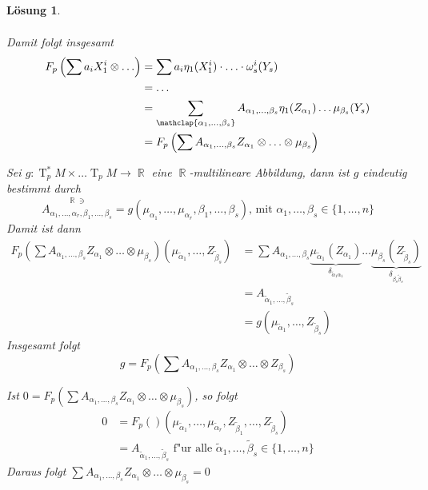 \documentclass[paper=A4, twoside, chapterprefix=true, bibliography=totoc, headsepline]{scrbook}
\DeclareMathOperator{\R}{\mathbb{R}}
\DeclareMathOperator{\T}{T} %
\newcommand{\X}{\times}
\theoremstyle{plain}
\theoremstyle{nonumberplain}
\theoremstyle{empty}
\theoremstyle{break}
\newtheorem{Loes}{L\"osung}
\begin{document}
\begin{Loes}
\begin{description}[leftmargin=*]
\begin{itemize}[leftmargin=*]
\begin{align*}
			\end{align*}
			Damit folgt insgesamt
			\begin{align*}
				F_p\left(\sum a_i X_1^{i} \otimes \ldots \right) &= \sum a_i \eta_1 (X_1^{i}) \cdot \ldots \cdot \omega_s^{i} (Y_s) \\
					& = \ldots \\
					& = \sum_{\mathclap{\alpha_1,\ldots ,\beta_s}} A_{\alpha_1,\ldots ,\beta_s} \eta_1(Z_{\alpha_1}) \ldots \mu_{\beta_s}(Y_s)\\
					& = F_p \left(\sum A_{\alpha_1,\ldots ,\beta_s} Z_{\alpha_1} \otimes \ldots \otimes \mu_{\beta_s}\right)
			\end{align*}
	\end{itemize}
\item[$\bm{F_p}$ ist $\R$-linear]
\item[$\bm{F_p}$ ist surjektiv:]
	Sei $g: \T_p^*M \X \ldots \T_pM \to \R$ eine $\R$-multilineare Abbildung, dann ist $g$ eindeutig bestimmt durch
		\[ \overset{\R \ni}{A_{\alpha_1, \ldots , \alpha_r, \beta_1, \ldots , \beta_s}} = g(\mu_{\alpha_1}, \ldots , \mu_{\alpha_r}, \beta_1, \ldots , \beta_s) \text{, mit } \alpha_1, \ldots , \beta_s \in \{1,\ldots ,n\} \]
	Damit ist dann
	\begin{align*}
		F_p\left(\sum A_{\alpha_1,\ldots ,\beta_s} Z_{\alpha_1} \otimes \ldots \otimes \mu_{\beta_s}\right) (\mu_{\tilde\alpha_1},\ldots ,Z_{\tilde\beta_s}) &= \sum A_{\alpha_1,\ldots ,\beta_s} \underbrace{\mu_{\tilde \alpha_1}(Z_{\alpha_1})}_{\delta_{\tilde \alpha_1 \alpha_1}} \ldots \underbrace{\mu_{\beta_s} (Z_{\tilde \beta_s})}_{\delta_{\beta_s\tilde\beta_s}}\\
		&= A_{\tilde\alpha_1,\ldots ,\tilde\beta_s}\\
		&= g(\mu_{\tilde\alpha_1},\ldots ,Z_{\tilde\beta_s})
	\end{align*}
	Insgesamt folgt
		\[ g = F_p\left(\sum A_{\alpha_1,\ldots ,\beta_s} Z_{\alpha_1} \otimes \ldots  \otimes Z_{\beta_s}\right) \]
\item[$\bm{F_p}$ ist injektiv:]
	Ist $0 = F_p(\sum A_{\alpha_1,\ldots ,\beta_s} Z_{\alpha_1} \otimes \ldots \otimes \mu_{\beta_s})$, so folgt
	\begin{align*}
		0 &= F_p() (\mu_{\tilde\alpha_1},\ldots ,\mu_{\tilde\alpha_r}, Z_{\tilde\beta_1}, \ldots , Z_{\tilde\beta_s})\\
		&= A_{\tilde\alpha_1,\ldots ,\tilde\beta_s} \text{ f"ur alle } \tilde\alpha_1, \ldots , \tilde\beta_s \in \{1,\ldots ,n\}
	\end{align*}
	Daraus folgt $\sum A_{\alpha_1,\ldots ,\beta_s} Z_{\alpha_1} \otimes \ldots \otimes \mu_{\beta_s} = 0$

\end{description}
\end{Loes}
\end{document}
